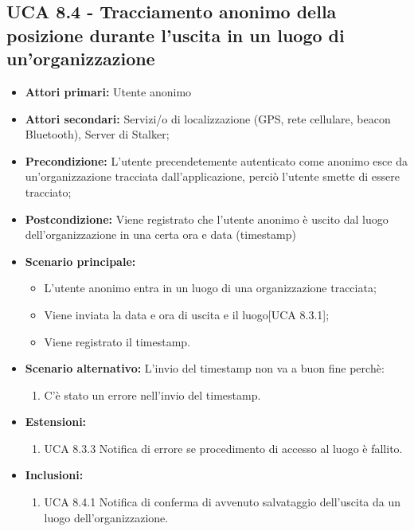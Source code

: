 \subsection{UCA 8.4 - Tracciamento anonimo della posizione durante l'uscita in un luogo di un'organizzazione} %
\begin{itemize}
	\item \textbf{Attori primari:} Utente anonimo 
	\item \textbf{Attori secondari:} Servizi/o di localizzazione (GPS, rete cellulare, beacon Bluetooth), Server di Stalker;
	\item \textbf{Precondizione:} L'utente precendetemente autenticato come anonimo esce da un'organizzazione tracciata dall'applicazione, perciò l'utente smette di essere tracciato;
\item \textbf{Postcondizione:} Viene registrato che l'utente anonimo è uscito dal luogo dell'organizzazione in una certa ora e data (timestamp)
\item \textbf{Scenario principale:}
\begin{itemize}
	\item L'utente anonimo entra in un luogo di una organizzazione tracciata;
	\item Viene inviata la data e ora di uscita e il luogo[UCA 8.3.1];
	\item Viene registrato il timestamp.
\end{itemize}
\item \textbf{Scenario alternativo:} L'invio del timestamp non va a buon fine perchè:
\begin{enumerate}
	\item C'è stato un errore nell'invio del timestamp.
\end{enumerate}
\item \textbf{Estensioni:}
\begin{enumerate}
	\item UCA 8.3.3 Notifica di errore se procedimento di accesso al luogo è fallito.
\end{enumerate}
\item \textbf{Inclusioni:}
\begin{enumerate}
	\item UCA 8.4.1 Notifica di conferma di avvenuto salvataggio dell'uscita da un luogo dell'organizzazione.
\end{enumerate}
\end{itemize}

